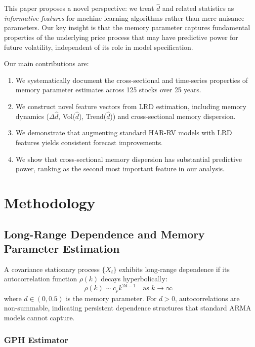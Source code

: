 \documentclass[12pt,a4paper]{article}
\begin{document}
This paper proposes a novel perspective: we treat $\hat{d}$ and related statistics as \emph{informative features} for machine learning algorithms rather than mere nuisance parameters. Our key insight is that the memory parameter captures fundamental properties of the underlying price process that may have predictive power for future volatility, independent of its role in model specification.

Our main contributions are:
\begin{enumerate}
    \item We systematically document the cross-sectional and time-series properties of memory parameter estimates across 125 stocks over 25 years.
    \item We construct novel feature vectors from LRD estimation, including memory dynamics ($\Delta\hat{d}$, Vol($\hat{d}$), Trend($\hat{d}$)) and cross-sectional memory dispersion.
    \item We demonstrate that augmenting standard HAR-RV models with LRD features yields consistent forecast improvements.
    \item We show that cross-sectional memory dispersion has substantial predictive power, ranking as the second most important feature in our analysis.
\end{enumerate}

\section{Methodology}
\label{sec:methodology}

\subsection{Long-Range Dependence and Memory Parameter Estimation}

A covariance stationary process $\{X_t\}$ exhibits long-range dependence if its autocorrelation function $\rho(k)$ decays hyperbolically:
\begin{equation}
    \rho(k) \sim c_\rho k^{2d-1} \quad \text{as } k \to \infty
\end{equation}
where $d \in (0, 0.5)$ is the memory parameter. For $d > 0$, autocorrelations are non-summable, indicating persistent dependence structures that standard ARMA models cannot capture.

\subsubsection{GPH Estimator}
\end{document}
